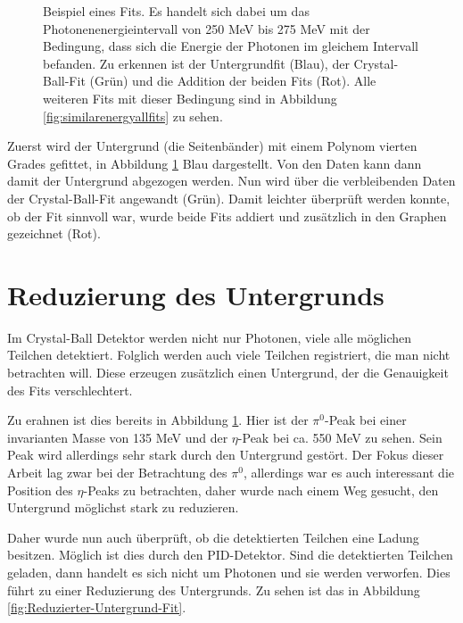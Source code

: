\documentclass[a4paper,11pt,oneside,final,german,openbib,pdftex]{scrbook}
\begin{document}
{\begin{figure}[h!]
\begin{center}
		\caption[Strahlzeit: Beispielfit f\"ur die Crystal-Ball-Fitfunktion]{Beispiel eines Fits. Es handelt sich dabei um das Photonenenergieintervall von 250 MeV bis 275 MeV mit der Bedingung, dass sich die Energie der Photonen im gleichem Intervall befanden.
			Zu erkennen ist der Untergrundfit (Blau), der Crystal-Ball-Fit (Gr\"un) und die Addition der beiden Fits (Rot). Alle weiteren Fits mit dieser Bedingung sind in Abbildung \ref{fig:similarenergyallfits} zu sehen.
		}
		\label{fig:fitexampleenergyinterval0903}	
	\end{center}
\end{figure}

Zuerst wird der Untergrund (die Seitenb\"ander) mit einem Polynom vierten Grades gefittet, in Abbildung \ref{fig:fitexampleenergyinterval0903} Blau dargestellt. Von den Daten kann dann damit der Untergrund abgezogen werden. Nun wird \"uber die verbleibenden Daten der Crystal-Ball-Fit angewandt (Gr\"un). Damit leichter \"uberpr\"uft werden konnte, ob der Fit sinnvoll war, wurde beide Fits addiert und zus\"atzlich in den Graphen gezeichnet (Rot).


\section{Reduzierung des Untergrunds}

Im Crystal-Ball Detektor werden nicht nur Photonen, viele alle m\"oglichen Teilchen detektiert. Folglich werden auch viele Teilchen registriert, die man nicht betrachten will. Diese erzeugen zus\"atzlich einen Untergrund, der die Genauigkeit des Fits verschlechtert.

Zu erahnen ist dies bereits in Abbildung \ref{fig:fitexampleenergyinterval0903}. Hier ist der $\pi^0$-Peak bei einer invarianten Masse von 135 MeV und der $\eta$-Peak bei ca. 550 MeV zu sehen. Sein Peak wird allerdings sehr stark durch den Untergrund gest\"ort. Der Fokus dieser Arbeit lag zwar bei der Betrachtung des $\pi^0$, allerdings war es auch interessant die Position des $\eta$-Peaks zu betrachten, daher wurde nach einem Weg gesucht, den Untergrund m\"oglichst stark zu reduzieren. 

Daher wurde nun auch \"uberpr\"uft, ob die detektierten Teilchen eine Ladung besitzen. M\"oglich ist dies durch den PID-Detektor. Sind die detektierten Teilchen geladen, dann handelt es sich nicht um Photonen und sie werden verworfen. Dies f\"uhrt zu einer Reduzierung des Untergrunds. Zu sehen ist das in Abbildung \ref{fig:Reduzierter-Untergrund-Fit}.


}
\end{document}

